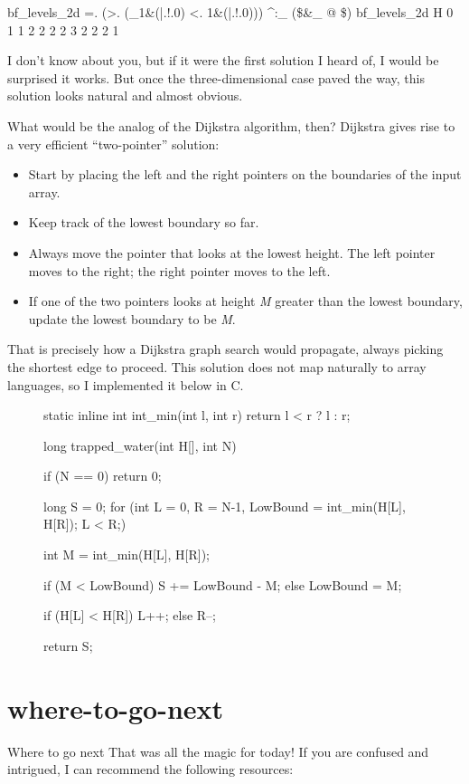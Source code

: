 \documentclass{article}
\begin{document}
\begin{code}[j]
    bf_levels_2d =. (>. (_1&(|.!.0) <. 1&(|.!.0))) ^:_ (\$&_ @ \$)
    bf_levels_2d H
0 1 1 2 2 2 2 3 2 2 2 1
\end{code}

I don't know about you, but if it were the first solution I heard of, I would be surprised it works.
But once the three-dimensional case paved the way, this solution looks natural and almost obvious.

What would be the analog of the Dijkstra algorithm, then?
Dijkstra gives rise to a very efficient ``two-pointer'' solution:

\begin{itemize}
  \item Start by placing the left and the right pointers on the boundaries of the input array.
  \item Keep track of the lowest boundary so far.
  \item 
    Always move the pointer that looks at the lowest height.
    The left pointer moves to the right; the right pointer moves to the left.
  \item If one of the two pointers looks at height \emph{M} greater than the lowest boundary, update the lowest boundary to be \emph{M}.
\end{itemize}

That is precisely how a Dijkstra graph search would propagate, always picking the shortest edge to proceed.
This solution does not map naturally to array languages, so I implemented it below in C.

\begin{figure}
\begin{code}[c]
static inline int int_min(int l, int r) { return l < r ? l : r; }

long trapped_water(int H[], int N) {
  if (N == 0) return 0;
  
  long S = 0;
  for (int L = 0, R = N-1, LowBound = int_min(H[L], H[R]); L < R;) {
    int M = int_min(H[L], H[R]);

    if (M < LowBound) S += LowBound - M;
    else LowBound = M;

    if (H[L] < H[R]) L++; else R--;
  }
  return S;
}
\end{code}
\end{figure}

\section{where-to-go-next}{Where to go next}
That was all the  magic for today!
If you are confused and intrigued, I can recommend the following resources:
\end{document}
